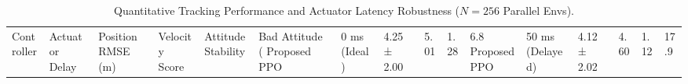 \begin{table}
\caption{Quantitative Tracking Performance and Actuator Latency Robustness ($N=256$ Parallel Envs).}
\label{tab:latency_results}
\begin{tabular}{llllllll}
\toprule
Controller & Actuator Delay & Position RMSE (m) & Velocity Score & Attitude Stability & Bad Attitude (%
\midrule
Proposed PPO & 0 ms (Ideal) & 4.25 ± 2.00 & 5.01 & 1.28 & 6.8%
Proposed PPO & 50 ms (Delayed) & 4.12 ± 2.02 & 4.60 & 1.12 & 17.9%
\bottomrule
\end{tabular}
\end{table}
